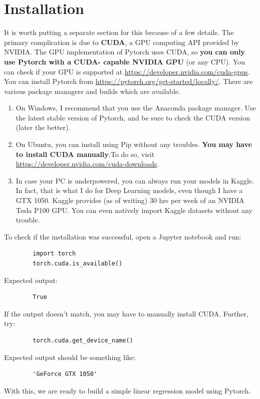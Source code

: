 \documentclass{article}
\begin{document}
    \section{Installation}
    It is worth putting a separate section for this because of a few details. The primary
    complication is due to \textbf{CUDA}, a GPU computing API provided by NVIDIA. The GPU 
    implementation of Pytorch uses CUDA, so \textbf{you can only use Pytorch with a CUDA-
    capable NVIDIA GPU} (or any CPU). You can check if your GPU is supported at \url{https://developer.nvidia.com/cuda-gpus}.
    \\
    You can install Pytorch from \url{https://pytorch.org/get-started/locally/}. There are 
    various package managers and builds which are available.
    \begin{enumerate}
        \item On Windows, I recommend that you use the Anaconda package manager. Use the latest 
            stable version of Pytorch, and be sure to check the CUDA version (later the better).
        \item On Ubuntu, you can install using Pip without any troubles. \textbf{You may have to
        install CUDA manually}.To do so, visit \url{https://developer.nvidia.com/cuda-downloads}.
        \item In case your PC is underpowered, you can always run your models in Kaggle.
        In fact, that is what I do for Deep Learning models, even though I have a GTX 1050. 
        Kaggle provides (as of writing) 30 hrs per week of an NVIDIA Tesla P100 GPU. 
        You can even natively import Kaggle datasets without any trouble.
    \end{enumerate}
    To check if the installation was successful, open a Jupyter notebook and run:
    \begin{verbatim}
        import torch
        torch.cuda.is_available()
    \end{verbatim}
    Expected output:
    \begin{verbatim}
        True
    \end{verbatim}
    If the output doesn't match, you may have to manually install CUDA. Further, try:
    \begin{verbatim}
        torch.cuda.get_device_name()
    \end{verbatim}
    Expected output should be something like:
    \begin{verbatim}
        'GeForce GTX 1050'
    \end{verbatim}
    With this, we are ready to build a simple linear regression model using Pytorch.
\end{document}
